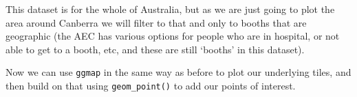 \documentclass[
]{book}
\newenvironment{Shaded}{\begin{snugshade}}{\end{snugshade}}
\newcommand{\CommentTok}[1]{\textcolor[rgb]{0.56,0.35,0.01}{\textit{#1}}}
\newcommand{\DecValTok}[1]{\textcolor[rgb]{0.00,0.00,0.81}{#1}}
\newcommand{\KeywordTok}[1]{\textcolor[rgb]{0.13,0.29,0.53}{\textbf{#1}}}
\newcommand{\NormalTok}[1]{#1}
\newcommand{\OperatorTok}[1]{\textcolor[rgb]{0.81,0.36,0.00}{\textbf{#1}}}
\newcommand{\StringTok}[1]{\textcolor[rgb]{0.31,0.60,0.02}{#1}}
\begin{document}
This dataset is for the whole of Australia, but as we are just going to plot the area around Canberra we will filter to that and only to booths that are geographic (the AEC has various options for people who are in hospital, or not able to get to a booth, etc, and these are still `booths' in this dataset).

\begin{Shaded}
\end{Shaded}

Now we can use \texttt{ggmap} in the same way as before to plot our underlying tiles, and then build on that using \texttt{geom\_point()} to add our points of interest.
\end{document}
